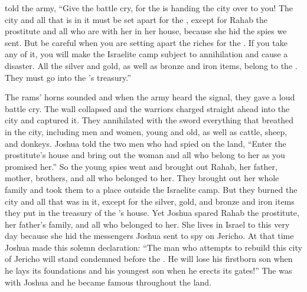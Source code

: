 {told
the army, “Give the battle cry,
for
the {}
is handing
the
city over to you!
The city
and all
that
is in it must be set apart for the
{}, except
for Rahab
the prostitute
and all
who
are with
her in her house,
because
she hid
the
spies
we sent.
But
be careful
when you are
setting
apart the riches
for the
{}. If you
take
any
of it, you will make
the
Israelite
camp
subject to annihilation
and cause a disaster.
All
the silver
and gold,
as well as bronze
and iron
items, belong
to the
{}. They must go
into the
{}’s
treasury.”
\par }{\PP {}The rams’ horns
sounded
and when
the army
heard
the signal,
they
gave
a loud
battle cry.
The wall
collapsed
and the warriors
charged
straight ahead
into the city
and captured it.
They annihilated
with the sword
everything
that
breathed in the city,
including men
and women,
young
and old,
as well as
cattle,
sheep,
and donkeys.
Joshua
told
the two
men
who had spied
on the land,
“Enter
the prostitute’s
house
and bring out
the woman
and all
who belong
to her as
you promised her.”
So the young
spies
went
and brought out
Rahab,
her father,
mother,
brothers,
and all
who
belonged to her. They brought out
her whole
family
and took
them to a place outside
the Israelite
camp.
But they burned
the city
and all
that
was in it, except
for the silver,
gold,
and bronze
and iron
items
they put
in the treasury
of the
{}’s
house.
Yet Joshua
spared
Rahab
the prostitute,
her father’s
family,
and all
who belonged
to her. She lives
in
Israel
to this very
day
because
she hid
the messengers
Joshua
sent
to spy
on Jericho.
At that time
Joshua
made this solemn
declaration: “The man
who
attempts to rebuild
this
city
of Jericho
will stand
condemned before
the {}. He will lose his firstborn son
when he lays its foundations
and his youngest
son when he erects
its gates!”
The
{}
was with
Joshua
and he became
famous
throughout
the land.

\par }
